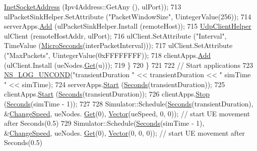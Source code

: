 \begin{DoxyCode}
{      \hyperlink{classns3_1_1InetSocketAddress}{InetSocketAddress} (Ipv4Address::GetAny (), ulPort));
713         ulPacketSinkHelper.SetAttribute (\textcolor{stringliteral}{"PacketWindowSize"}, UintegerValue(256));
714         serverApps.\hyperlink{classns3_1_1ApplicationContainer_ad09ab1a1ad5849d518d5f4c262e38152}{Add} (ulPacketSinkHelper.Install (remoteHost));
715         \hyperlink{classns3_1_1UdpClientHelper}{UdpClientHelper} ulClient (remoteHostAddr, ulPort);
716         ulClient.SetAttribute (\textcolor{stringliteral}{"Interval"}, TimeValue (\hyperlink{group__timecivil_ga17465a639c8d1464e76538afdd78a9f0}{MicroSeconds}(interPacketInterval)));
717         ulClient.SetAttribute (\textcolor{stringliteral}{"MaxPackets"}, UintegerValue(0xFFFFFFFF));
718         clientApps.\hyperlink{classns3_1_1ApplicationContainer_ad09ab1a1ad5849d518d5f4c262e38152}{Add} (ulClient.Install (ueNodes.\hyperlink{classns3_1_1NodeContainer_a9ed96e2ecc22e0f5a3d4842eb9bf90bf}{Get}(u)));
719       \}
720   \}
721 
722   \textcolor{comment}{// Start applications}
723   \hyperlink{log-macros-disabled_8h_a0b36e5e182b37194f85ef1c5e979fb2e}{NS\_LOG\_UNCOND}(\textcolor{stringliteral}{"transientDuration "} << transientDuration << \textcolor{stringliteral}{" simTime "} << simTime);
724   serverApps.\hyperlink{classns3_1_1ApplicationContainer_a8eff87926507020bbe3e1390358a54a7}{Start} (\hyperlink{group__timecivil_ga33c34b816f8ff6628e33d5c8e9713b9e}{Seconds}(transientDuration));
725   clientApps.\hyperlink{classns3_1_1ApplicationContainer_a8eff87926507020bbe3e1390358a54a7}{Start} (\hyperlink{group__timecivil_ga33c34b816f8ff6628e33d5c8e9713b9e}{Seconds}(transientDuration));
726   clientApps.\hyperlink{classns3_1_1ApplicationContainer_adfc52f9aa4020c8714679b00bbb9ddb3}{Stop} (\hyperlink{group__timecivil_ga33c34b816f8ff6628e33d5c8e9713b9e}{Seconds}(simTime - 1));
727 
728   Simulator::Schedule(\hyperlink{group__timecivil_ga33c34b816f8ff6628e33d5c8e9713b9e}{Seconds}(transientDuration), &\hyperlink{mc-twoenbs_8cc_a1fe18c61b129ac2c333ca0c841e280ee}{ChangeSpeed}, ueNodes.
      \hyperlink{classns3_1_1NodeContainer_a9ed96e2ecc22e0f5a3d4842eb9bf90bf}{Get}(0), \hyperlink{classns3_1_1Vector3D_a7e59b47bc94c9cb1dadff68c1d0112d8}{Vector}(ueSpeed, 0, 0)); \textcolor{comment}{// start UE movement after Seconds(0.5)}
729   Simulator::Schedule(\hyperlink{group__timecivil_ga33c34b816f8ff6628e33d5c8e9713b9e}{Seconds}(simTime - 1), &\hyperlink{mc-twoenbs_8cc_a1fe18c61b129ac2c333ca0c841e280ee}{ChangeSpeed}, ueNodes.
      \hyperlink{classns3_1_1NodeContainer_a9ed96e2ecc22e0f5a3d4842eb9bf90bf}{Get}(0), \hyperlink{classns3_1_1Vector3D_a7e59b47bc94c9cb1dadff68c1d0112d8}{Vector}(0, 0, 0)); \textcolor{comment}{// start UE movement after Seconds(0.5)}
}
\end{DoxyCode}
